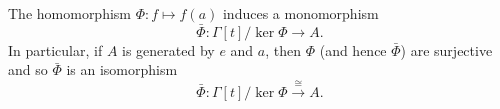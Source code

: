 The homomorphism $\Phi: f \mapsto f(a)$ induces a monomorphism
$$\bar{\Phi}: \Gamma[t] / \ker \Phi \rightarrow A.$$
In particular, if $A$ is generated by $e$ and $a$, then $\Phi$ (and hence $\bar{\Phi}$) are surjective and so $\bar{\Phi}$ is an isomorphism
$$\bar{\Phi}: \Gamma[t] / \ker \Phi \xrightarrow{\cong} A.$$
